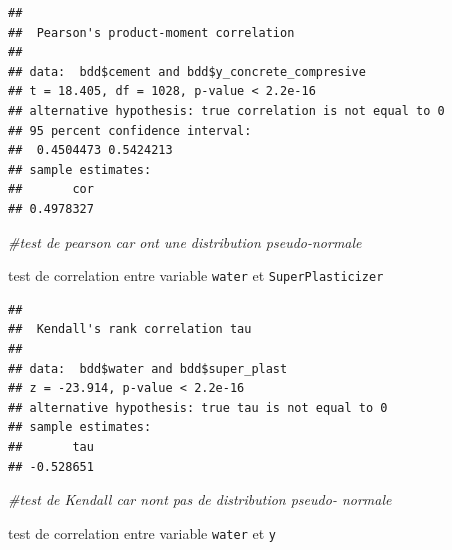 \documentclass[
  12pt,
]{article}
\newenvironment{Shaded}{\begin{snugshade}}{\end{snugshade}}
\newcommand{\AttributeTok}[1]{\textcolor[rgb]{0.13,0.29,0.53}{#1}}
\newcommand{\CommentTok}[1]{\textcolor[rgb]{0.56,0.35,0.01}{\textit{#1}}}
\newcommand{\FunctionTok}[1]{\textcolor[rgb]{0.13,0.29,0.53}{\textbf{#1}}}
\newcommand{\NormalTok}[1]{#1}
\newcommand{\SpecialCharTok}[1]{\textcolor[rgb]{0.81,0.36,0.00}{\textbf{#1}}}
\newcommand{\StringTok}[1]{\textcolor[rgb]{0.31,0.60,0.02}{#1}}
\begin{document}
\begin{verbatim}
## 
##  Pearson's product-moment correlation
## 
## data:  bdd$cement and bdd$y_concrete_compresive
## t = 18.405, df = 1028, p-value < 2.2e-16
## alternative hypothesis: true correlation is not equal to 0
## 95 percent confidence interval:
##  0.4504473 0.5424213
## sample estimates:
##       cor 
## 0.4978327
\end{verbatim}

\begin{Shaded}
\begin{Highlighting}[]
\CommentTok{\#test de pearson car ont une distribution pseudo{-}normale}
\end{Highlighting}
\end{Shaded}

test de correlation entre variable \texttt{water} et
\texttt{SuperPlasticizer}

\begin{Shaded}
\end{Shaded}

\begin{verbatim}
## 
##  Kendall's rank correlation tau
## 
## data:  bdd$water and bdd$super_plast
## z = -23.914, p-value < 2.2e-16
## alternative hypothesis: true tau is not equal to 0
## sample estimates:
##       tau 
## -0.528651
\end{verbatim}

\begin{Shaded}
\begin{Highlighting}[]
\CommentTok{\#test de Kendall car n\textquotesingle{}ont pas de distribution pseudo{-} normale}
\end{Highlighting}
\end{Shaded}

test de correlation entre variable \texttt{water} et \texttt{y}

\begin{Shaded}
\end{Shaded}
\end{document}
